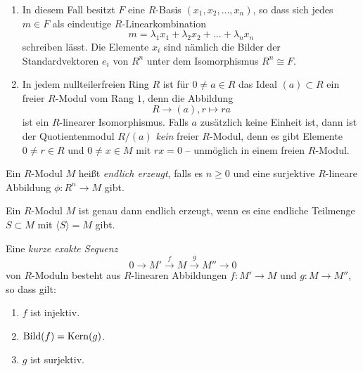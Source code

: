 \documentclass{book}
\begin{document}
\begin{exas}
    \label{exas:fg} 
    \begin{enumerate}
        \item In diesem Fall besitzt $F$ eine $R$-Basis $(x_1,
            x_2, ..., x_n)$, so dass sich jedes $m \in F$ als eindeutige
            $R$-Linearkombination
            \[
                m = \lambda_1 x_1 + \lambda_2 x_2 + ... + \lambda_n x_n
            \]
            schreiben lässt. Die Elemente $x_i$ sind nämlich die Bilder der
            Standardvektoren $e_i$ von $R^n$ unter dem Isomorphismus $R^n \cong
            F$.
        \item In jedem nullteilerfreien Ring $R$ ist für $0 \ne a \in R$ 
            das Ideal $(a) \subset R$ ein freier $R$-Modul vom Rang $1$,
            denn die Abbildung
            \[
                R \to (a), r \mapsto ra
            \]
            ist ein $R$-linearer Isomorphismus. Falls $a$ zusätzlich keine
            Einheit ist, dann ist der Quotientenmodul $R/(a)$ \emph{kein}
            freier $R$-Modul, denn es gibt Elemente $0 \ne r \in R$ und $0 \ne x \in M$ 
            mit $rx = 0$ -- unmöglich in einem freien $R$-Modul.
    \end{enumerate} 
\end{exas}

\begin{defi}
    \label{defi:label}
    Ein $R$-Modul $M$ heißt \emph{endlich erzeugt}, falls es $n \ge 0$ und eine
    surjektive $R$-lineare Abbildung $\phi: R^n \to M$ gibt. 
\end{defi}

\begin{rem}
    \label{rem:label}
    Ein $R$-Modul $M$ ist genau dann endlich erzeugt, wenn es eine endliche
    Teilmenge $S \subset M$ mit $\langle S \rangle = M$ gibt. 
\end{rem}

\begin{defi}
    \label{defi:ses}
    Eine \emph{kurze exakte Sequenz}
    \[
        0 \to M' \overset{f}{\to} M \overset{g}{\to} M'' \to 0
    \]
    von $R$-Moduln besteht aus $R$-linearen Abbildungen $f: M' \to M$ und $g: M \to M''$, so dass gilt:   \begin{enumerate}
        \item $f$ ist injektiv.
        \item $\operatorname{Bild}(f) = \operatorname{Kern}(g)$. 
        \item $g$ ist surjektiv. 
    \end{enumerate}
\end{defi}
\end{document}
